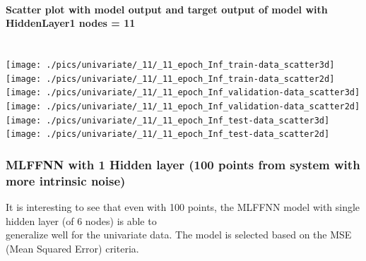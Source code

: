 \documentclass[fleqn]{article}
\newcommand{\myparagraph}[1]{\paragraph{#1}\mbox{}\\}
\begin{document}
\newpage
\myparagraph{Scatter plot with model output and target output of model with HiddenLayer1 nodes = 11}

\texttt{[image: ./pics/univariate/\_11/\_11\_epoch\_Inf\_train-data\_scatter3d]}
\texttt{[image: ./pics/univariate/\_11/\_11\_epoch\_Inf\_train-data\_scatter2d]}
\texttt{[image: ./pics/univariate/\_11/\_11\_epoch\_Inf\_validation-data\_scatter3d]}
\texttt{[image: ./pics/univariate/\_11/\_11\_epoch\_Inf\_validation-data\_scatter2d]}
\texttt{[image: ./pics/univariate/\_11/\_11\_epoch\_Inf\_test-data\_scatter3d]}
\texttt{[image: ./pics/univariate/\_11/\_11\_epoch\_Inf\_test-data\_scatter2d]}


\subsubsection{MLFFNN with 1 Hidden layer (100 points from system with more intrinsic noise)}

It is interesting to see that even with 100 points, the MLFFNN model with single hidden layer (of 6 nodes) is able to \\
generalize well for the univariate data. The model is selected based on the MSE (Mean Squared Error) criteria.
\end{document}
